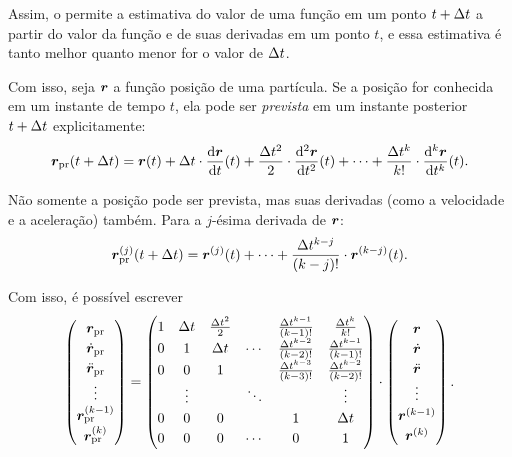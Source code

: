 Assim, o  permite a estimativa do valor de uma função em um ponto \(t+\Delta t\) a partir do valor da função e de suas derivadas em um ponto \(t\), e essa estimativa é tanto melhor quanto menor for o valor de \(\Delta t\).

Com isso, seja \(\bm{r}\) a função posição de uma partícula. Se a posição for conhecida em um instante de tempo \(t\), ela pode ser \textit{prevista} em um instante posterior \(t+\Delta t\) explicitamente:
\begin{equation} \label{eq:position_prediction}
	\predicted{\position}\pqty{t+\Dt} = \position\pqty{t} + \Dt\cdot\dv{\position}{t}\pqty{t} + \dfrac{\Dt^2}{2}\cdot \dv[2]{\position}{t}\pqty{t} + \dots + \dfrac{\Dt^\taylorOrder}{\taylorOrder!}\cdot \dv[\taylorOrder]{\position}{t}\pqty{t}.
\end{equation}

Não somente a posição pode ser prevista, mas suas derivadas (como a velocidade e a aceleração) também. Para a \(j\)-ésima derivada de \(\bm{r}\):
\[
	\predicted{\deriv{j}{\position}}\pqty{t + \Dt} = \deriv{j}{\position}\pqty{t} + \dots + \dfrac{\Dt^{\taylorOrder-j}}{\pqty{\taylorOrder-j}!}\cdot\deriv{\taylorOrder-j}{\position}\pqty{t}.
\]

Com isso, é possível escrever
\[
	\def\arraystretch{1.2}
\begin{pmatrix}
	\predicted{\position} \\
	\predicted{\deriv{1}{\position}} \\
	\predicted{\deriv{2}{\position}} \\
	\vdots \\
	\predicted{\deriv{\taylorOrder-1}{\position}} \\
	\predicted{\deriv{\taylorOrder}{\position}}
\end{pmatrix}
=
\begin{pmatrix}
	1 & \Dt & \frac{\Dt^2}{2} &  & \frac{\Dt^{\taylorOrder-1}}{\pqty{\taylorOrder-1}!} & \frac{\Dt^\taylorOrder}{\taylorOrder!} \\
	0 & 1 & \Dt & \cdots & \frac{\Dt^{\taylorOrder-2}}{\pqty{\taylorOrder-2}!} & \frac{\Dt^{\taylorOrder-1}}{\pqty{\taylorOrder-1}!} \\
	0 & 0 & 1 &  & \frac{\Dt^{\taylorOrder-3}}{\pqty{\taylorOrder-3}!} & \frac{\Dt^{\taylorOrder-2}}{\pqty{\taylorOrder-2}!} \\
     & \vdots & & \ddots & & \vdots \\
    0 & 0 & 0 &  & 1 & \Dt \\
    0 & 0 & 0 & \cdots & 0 & 1
\end{pmatrix}
\cdot
\begin{pmatrix}
	\position \\
	\deriv{1}{\position} \\
	\deriv{2}{\position} \\
	\vdots \\
	\deriv{\taylorOrder-1}{\position} \\
	\deriv{\taylorOrder}{\position}
\end{pmatrix}.
\]

